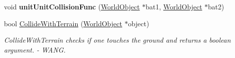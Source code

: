 \begin{DoxyCompactItemize}
\item 
void {\bfseries unit\+Unit\+Collision\+Func} (\hyperlink{class_world_object}{World\+Object} $\ast$bat1, \hyperlink{class_world_object}{World\+Object} $\ast$bat2)\hypertarget{class_physics_calc_aacab28a38556f2a29e52068f09a3a4f0}{}\label{class_physics_calc_aacab28a38556f2a29e52068f09a3a4f0}

\item 
bool \hyperlink{class_physics_calc_a88dc6d26563c0a340cd5c4470801b419}{Collide\+With\+Terrain} (\hyperlink{class_world_object}{World\+Object} $\ast$object)\hypertarget{class_physics_calc_a88dc6d26563c0a340cd5c4470801b419}{}\label{class_physics_calc_a88dc6d26563c0a340cd5c4470801b419}

\begin{DoxyCompactList}\small\item\em Collide\+With\+Terrain checks if one touches the ground and returns a boolean argument. -\/ W\+A\+NG. \end{DoxyCompactList}\end{DoxyCompactItemize}
